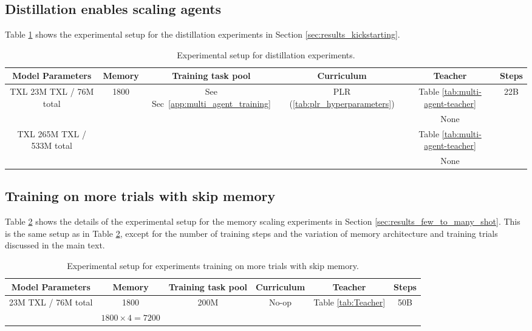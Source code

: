 \documentclass[11pt, a4paper, logo, copyright]{deepmind}
\begin{document}
\begin{appendix}
\subsection{Distillation enables scaling agents}
\label{app:distillation-exp}
Table \ref{tab:distillation-exp} shows the experimental setup for the distillation experiments in Section \ref{sec:results_kickstarting}.
\begin{table}[h!]
  \begin{center}
    \caption{Experimental setup for distillation experiments.}
    \begin{tabular}{c|c|c|c|c|c}
    \label{tab:distillation-exp}
      Model Parameters & Memory & Training task pool & Curriculum & Teacher & Steps\\
      \hline
      \multirow{2}{*}{TXL 23M TXL / 76M total} & \multirow{4}{*}{1800} & \multirow{4}{*}{See Sec~\ref{app:multi_agent_training}} & \multirow{4}{*}{PLR (\ref{tab:plr_hyperparameters})} &Table \ref{tab:multi-agent-teacher} & \multirow{4}{*}{22B}\\
      &&&&None&\\
      \multirow{2}{*}{TXL 265M TXL / 533M total}&&&& Table \ref{tab:multi-agent-teacher}&\\
      &&&&None&\\
    \end{tabular}
  \end{center}
\end{table}
\subsection{Training on more trials with skip memory}
\label{app:skip-memory-scaling}
Table \ref{tab:skip-memory-scaling} shows the details of the experimental setup for the memory scaling experiments in Section \ref{sec:results_few_to_many_shot}. This is the same setup as in Table \ref{tab:skip-memory-scaling}, except for the number of training steps and the variation of memory architecture and training trials discussed in the main text.
\begin{table}[h!]
  \begin{center}
    \caption{Experimental setup for experiments training on more trials with skip memory.}
    \begin{tabular}{c|c|c|c|c|c}
    \label{tab:skip-memory-scaling}
      Model Parameters & Memory & Training task pool & Curriculum & Teacher & Steps \\
      \hline
      \multirow{2}{*}{23M TXL / 76M total} & 1800 & \multirow{2}{*}{200M} &
      \multirow{2}{*}{No-op} &
      \multirow{2}{*}{Table \ref{tab:Teacher}} & \multirow{2}{*}{50B}\\
      & $1800 \times 4=7200$ &&&&\\
    \end{tabular}
  \end{center}
\end{table}
\newpage

\end{appendix}
\end{document}
